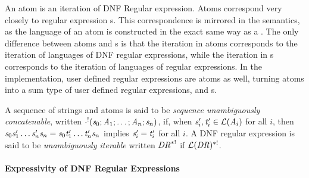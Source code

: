 \documentclass[numbers,10pt,preprint\ifanon ,nocopyrightspace\fi]{sigplanconf}
\begin{document}
An atom is an iteration of DNF Regular expression.  Atoms correspond very
closely to regular expression \StarRegexType{}s.  This correspondence is mirrored in the
semantics, as the language of an atom is constructed in the exact same way as a
\StarRegexType{}.  The only difference between atoms and \StarRegexType{}s
is that the iteration in atoms
corresponds to the iteration of languages of DNF regular expressions, while the
iteration in \StarRegexType{}s corresponds to the iteration of languages of
regular expressions.  In the implementation, user defined regular expressions
are atoms as well, turning atoms into a sum type of user defined regular
expressions, and \StarAtomType{}s.

A sequence of strings and atoms is said to be \textit{sequence unambiguously
  concatenable},
written $\cdot^!(\mathit{s}_0;\mathit{A}_1;\ldots;\mathit{A}_n;\mathit{s}_n)$,
if, when $\mathit{s}_i',\mathit{t}_i'\in\mathcal{L}(\mathit{A}_i)$ for all $i$, then
$\mathit{s}_0\mathit{s}_1'\ldots\mathit{s}_n'\mathit{s}_n=
\mathit{s}_0\mathit{t}_1'\ldots\mathit{t}_n'\mathit{s}_n$
implies $\mathit{s}_i'=\mathit{t}_i'$ for all $i$.  A DNF regular expression is said
to be \textit{unambiguously iterable} written $\mathit{DR}^{*!}$ if
$\mathcal{L}(\mathit{DR})^{*!}$.

\paragraph*{Expressivity of DNF Regular Expressions}
\end{document}
